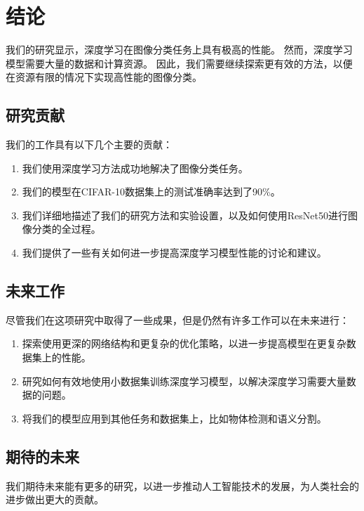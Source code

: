 

\section{结论}\label{sec:conclusion}
我们的研究显示，深度学习在图像分类任务上具有极高的性能。
然而，深度学习模型需要大量的数据和计算资源。
因此，我们需要继续探索更有效的方法，以便在资源有限的情况下实现高性能的图像分类。\par

\subsection{研究贡献}\label{subsec:research-contributions}
我们的工作具有以下几个主要的贡献：
\begin{enumerate}[noitemsep]
    \item 我们使用深度学习方法成功地解决了图像分类任务。
    \item 我们的模型在CIFAR-10数据集上的测试准确率达到了90\%。
    \item 我们详细地描述了我们的研究方法和实验设置，以及如何使用ResNet50进行图像分类的全过程。
    \item 我们提供了一些有关如何进一步提高深度学习模型性能的讨论和建议。
\end{enumerate}

\subsection{未来工作}\label{subsec:future-work}
尽管我们在这项研究中取得了一些成果，但是仍然有许多工作可以在未来进行：
\begin{enumerate}[noitemsep]
    \item 探索使用更深的网络结构和更复杂的优化策略，以进一步提高模型在更复杂数据集上的性能。
    \item 研究如何有效地使用小数据集训练深度学习模型，以解决深度学习需要大量数据的问题。
    \item 将我们的模型应用到其他任务和数据集上，比如物体检测和语义分割。
\end{enumerate}

\subsection{期待的未来}\label{subsec:hope-for-future}
我们期待未来能有更多的研究，以进一步推动人工智能技术的发展，为人类社会的进步做出更大的贡献。
